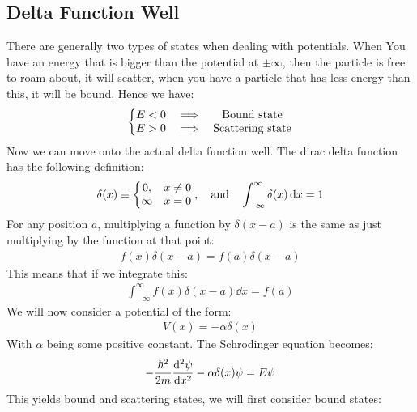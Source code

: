 \subsection{Delta Function Well}
There are generally two types of states when dealing with potentials. When You have an energy that is bigger than the potential at $\pm\infty$, then the particle is free to roam about, it will scatter, when you have a particle that has less energy than this, it will be bound. Hence we have:
\begin{align*}
  \left\{\mqty{
    E < 0 & \implies & \text{Bound state} \\
    E > 0 & \implies & \text{Scattering state} 
  } \right.
\end{align*}
Now we can move onto the actual delta function well. The dirac delta function has the following definition:
\begin{align*}
  \delta(x)\equiv\left\{\mqty{
    0, & x \neq 0 \\
    \infty & x = 0
  }\right., \quad\text{and}\quad \int_{-\infty}^{\infty}\delta(x)\dd{x}=1
\end{align*}
For any position $a$, multiplying a function by $\delta(x-a)$ is the same as just multiplying by the function at that point:
\begin{align*}
  f(x)\delta(x-a)=f(a)\delta(x-a)
\end{align*}
This means that if we integrate this:
\begin{align*}
  \int_{-\infty}^\infty f(x)\delta(x-a)\dd{x}=f(a)
\end{align*}
We will now consider a potential of the form:
\begin{align*}
  V(x)=-\alpha\delta(x)
\end{align*}
With $\alpha$ being some positive constant. The Schrodinger equation becomes:
\begin{align*}
  -\dfrac{\hbar^2}{2m}\dv[2]{\psi}{x}-\alpha\delta(x)\psi=E\psi
\end{align*}
This yields bound and scattering states, we will first consider bound states:
